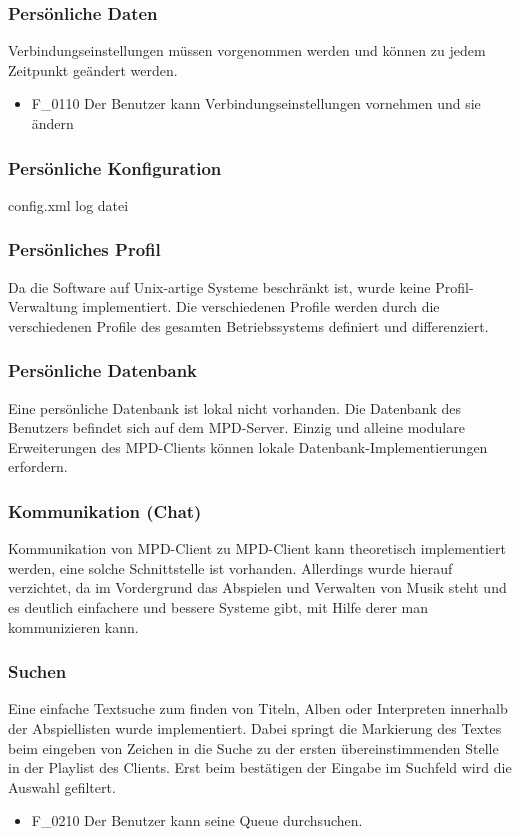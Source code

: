 \subsubsection{Persönliche Daten}
Verbindungseinstellungen müssen vorgenommen werden und können zu jedem Zeitpunkt geändert werden.
\begin{itemize}
	\item F\_0110 Der Benutzer kann Verbindungseinstellungen vornehmen und sie ändern
\end{itemize}
\subsubsection{Persönliche Konfiguration}
config.xml
log datei
\subsubsection{Persönliches Profil}
Da die Software auf Unix-artige Systeme beschränkt ist, wurde keine Profil-Verwaltung implementiert. Die
verschiedenen Profile werden durch die verschiedenen Profile des gesamten Betriebssystems definiert und differenziert.
\subsubsection{Persönliche Datenbank}
Eine persönliche Datenbank ist lokal nicht vorhanden. Die Datenbank des Benutzers befindet sich auf dem MPD-Server.
Einzig und alleine modulare Erweiterungen des MPD-Clients können lokale Datenbank-Implementierungen erfordern.
\subsubsection{Kommunikation (Chat)}
Kommunikation von MPD-Client zu MPD-Client kann theoretisch implementiert werden, eine solche Schnittstelle ist vorhanden.
Allerdings wurde hierauf verzichtet, da im Vordergrund das Abspielen und Verwalten von Musik steht und es deutlich
einfachere und bessere Systeme gibt, mit Hilfe derer man kommunizieren kann.
\subsubsection{Suchen}
Eine einfache Textsuche zum finden von Titeln, Alben oder Interpreten innerhalb der Abspiellisten wurde implementiert.
Dabei springt die Markierung des Textes beim eingeben von Zeichen in die Suche zu der ersten übereinstimmenden
Stelle in der Playlist des Clients. Erst beim bestätigen der Eingabe im Suchfeld wird die Auswahl gefiltert.
\begin{itemize}
        \item F\_0210 Der Benutzer kann seine Queue durchsuchen.
\end{itemize}

